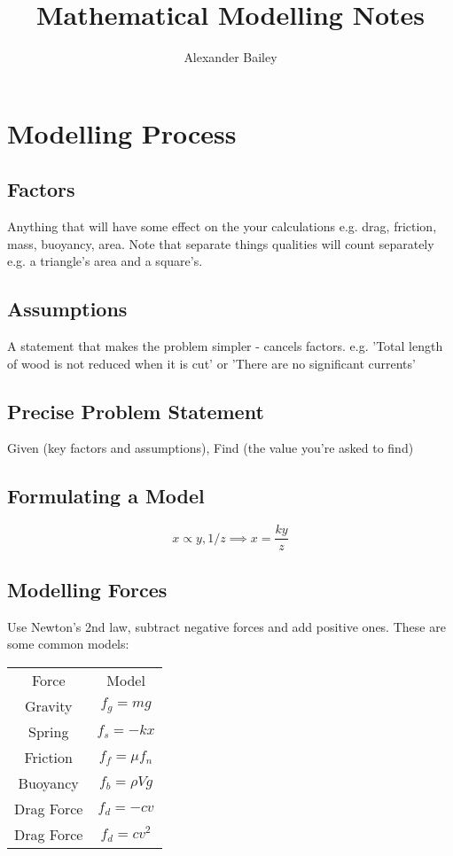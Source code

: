 \documentclass[12pt] {article}
\begin{document}
\title{Mathematical Modelling Notes}
\author{Alexander Bailey}
\maketitle

\section{Modelling Process}
\subsection*{Factors}
Anything that will have some effect on the your calculations e.g. drag, friction, mass, buoyancy, area.
Note that separate things qualities will count separately e.g. a triangle's area and a square's.

\subsection*{Assumptions}
A statement that makes the problem simpler - cancels factors. 
e.g. 'Total length of wood is not reduced when it is cut'
or 'There are no significant currents' 

\subsection*{Precise Problem Statement}
Given (key factors and assumptions), Find (the value you're asked to find)

\subsection*{Formulating a Model}
\begin{equation*}
x \propto y,1/z \implies x = \frac{ky}{z} 
\end{equation*}

\newpage
\subsection*{Modelling Forces}
Use Newton's 2nd law, subtract negative forces and add positive ones. These are some common models:

\begin{center}
\begin{tabular}{c|c}
  Force & Model \\
  Gravity & $f_g = mg$ \\
  Spring & $f_s = -kx$ \\
  Friction & $f_f = \mu f_n $ \\
  Buoyancy & $f_b = \rho V g$ \\
  Drag Force & $f_d = -cv $ \\
  Drag Force & $f_d = cv^2 $ \\
\end{tabular}
\end{center}
\end{document}
